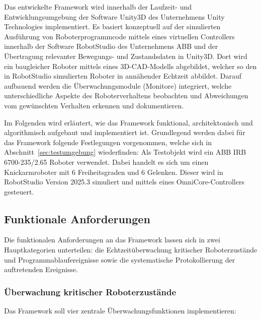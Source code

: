 Das entwickelte Framework wird innerhalb der Laufzeit- und
Entwicklungsumgebung der Software Unity3D des
Unternehmens Unity Technologies implementiert. Es basiert konzeptuell auf
der simulierten Ausführung von Roboterprogrammcode mittels eines virtuellen
Controllers innerhalb der Software RobotStudio des Unternehmens
ABB und der Übertragung relevanter Bewegungs- und Zustandsdaten in
Unity3D. Dort wird ein baugleicher Roboter mittels eines
3D-CAD-Modells abgebildet, welcher so den in RobotStudio simulierten
Roboter in annähender Echtzeit abbildet. Darauf aufbauend werden die
Überwachungsmodule (Monitore) integriert, welche unterschiedliche
Aspekte des Roboterverhaltens beobachten und Abweichungen vom gewünschten
Verhalten erkennen und dokumentieren.

Im Folgenden wird erläutert, wie das Framework funktional, architektonisch und
algorithmisch aufgebaut und implementiert ist. Grundlegend werden
dabei für das Framework folgende Festlegungen vorgenommen, welche
sich in Abschnitt~\ref{sec:testumgebung} wiederfinden: Als
Testobjekt wird ein ABB IRB 6700-235/2.65 Roboter verwendet. Dabei handelt es
sich um einen Knickarmroboter mit 6 Freiheitsgraden und 6
Gelenken. Dieser wird in RobotStudio Version 2025.3
simuliert und mittels eines OmniCore-Controllers gesteuert.

\subsection{Funktionale Anforderungen}

Die funktionalen Anforderungen an das Framework
lassen sich in zwei Hauptkategorien unterteilen: die Echtzeitüberwachung
kritischer Roboterzustände und Programmablaufereignisse sowie die
systematische Protokollierung der auftretenden Ereignisse.

\subsubsection{Überwachung kritischer Roboterzustände}

Das Framework soll vier zentrale Überwachungsfunktionen implementieren:

